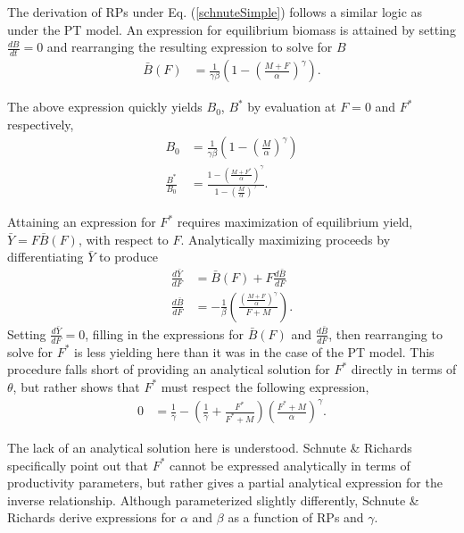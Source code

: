 %
The derivation of RPs under Eq. (\ref{schnuteSimple}) follows a similar logic
as under the PT model. An expression for equilibrium biomass is attained by
setting $\frac{dB}{dt}=0$ and rearranging the resulting expression to solve
for $B$
%
\begin{align}
\bar{B}(F) &= \frac{1}{\gamma \beta}\left(1-\left(\frac{M+F}{\alpha}\right)^\gamma\right).
\label{BsEq}
\end{align}

%
The above expression quickly yields $B_0$, $B^*$ by evaluation at $F=0$ and $F^*$ respectively,
\begin{align}
B_0 &= \frac{1}{\gamma \beta}\left(1-\left(\frac{M}{\alpha}\right)^\gamma\right) \label{B0S}\\
\frac{B^*}{B_0} &= \frac{1-\left(\frac{M+F^*}{\alpha}\right)^\gamma}{ 1-\left(\frac{M}{\alpha}\right)^\gamma }. \label{BratS}
\end{align}


%
Attaining an expression for $F^*$ requires maximization of equilibrium
yield, \mbox{$\bar{Y}=F\bar{B}(F)$}, with respect to $F$. Analytically maximizing
proceeds by differentiating $\bar{Y}$ to produce
%
\begin{align}
\frac{d \bar{Y}}{dF} &= \bar B(F) + F \frac{d \bar B}{dF} \label{FderivS}\\
\frac{d \bar B}{dF} &= -\frac{1}{\beta}  \left(\frac{\left(\frac{M+F}{\alpha}\right)^\gamma}{F+M}\right)\label{dBdFS}.
\end{align}
%
Setting $\frac{d \bar{Y}}{dF}=0$, filling in the expressions for $\bar B(F)$
and $\frac{d \bar B}{dF}$, then rearranging to solve for $F^*$ is less
yielding here than it was in the case of the PT model. This procedure falls
short of providing an analytical solution for $F^*$ directly in terms of
$\theta$, %
but rather shows that $F^*$ must respect the following expression,
%
\begin{align}\label{FmsyS}
0 &= \frac{1}{\gamma} - \left(\frac{1}{\gamma} + \frac{F^*}{F^*+M}\right)\left(\frac{F^*+M}{\alpha}\right)^\gamma.
\end{align}

The lack of an analytical solution here is understood.
Schnute \& Richards \cite[pg. 519]{schnute_analytical_1998} specifically point out that
$F^*$ cannot be expressed analytically in terms of productivity parameters,
but rather gives a partial analytical expression for the inverse relationship.
Although parameterized slightly differently, Schnute \& Richards %
derive expressions for $\alpha$ and $\beta$ as a function of RPs and $\gamma$.


